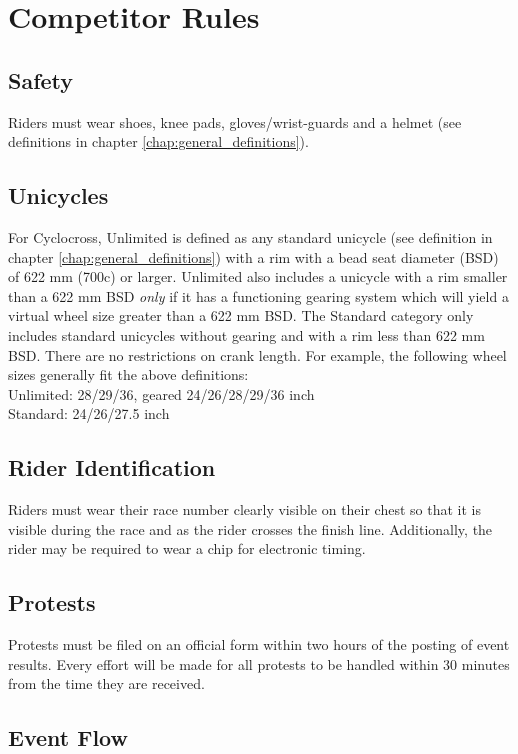 \chapter{Competitor Rules}

\section{Safety}
Riders must wear shoes, knee pads, gloves/wrist-guards and a helmet (see definitions in chapter \ref{chap:general_definitions}).

\section{Unicycles}

For Cyclocross, Unlimited is defined as any standard unicycle (see definition in chapter \ref{chap:general_definitions}) with a rim with a bead seat diameter (BSD) of 622 mm (700c) or larger.
Unlimited also includes a unicycle with a rim smaller than a 622 mm BSD {\em only} if it has a functioning gearing system which will yield a virtual wheel size greater than a 622 mm BSD.
The Standard category only includes standard unicycles without gearing and with a rim less than 622 mm BSD.
There are no restrictions on crank length.
For example, the following wheel sizes generally fit the above definitions: \\
Unlimited: 28/29/36, geared 24/26/28/29/36 inch \\
Standard: 24/26/27.5 inch


\section{Rider Identification}

Riders must wear their race number clearly visible on their chest so that it is visible during the race and as the rider crosses the finish line.
Additionally, the rider may be required to wear a chip for electronic timing.

\section{Protests}

Protests must be filed on an official form within two hours of the posting of event results.
Every effort will be made for all protests to be handled within 30 minutes from the time they are received.

\section{Event Flow}

